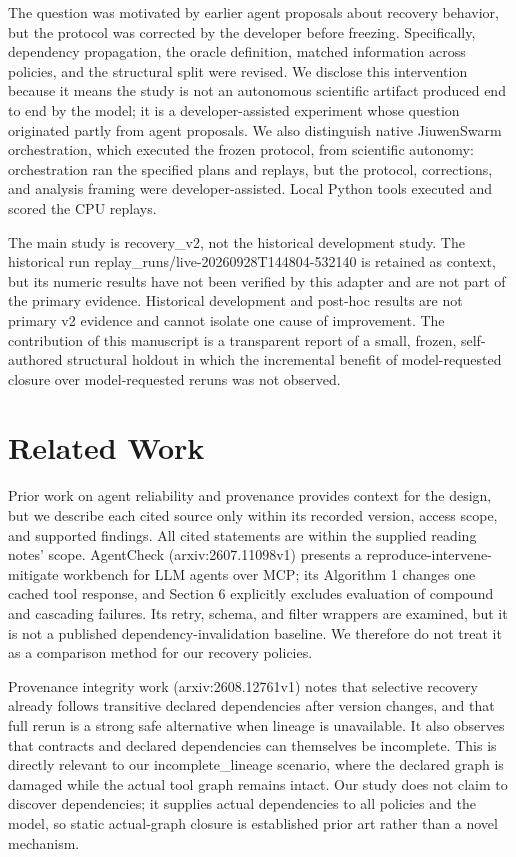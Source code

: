 \documentclass{article}
\begin{document}
The question was motivated by earlier agent proposals about recovery behavior, but the protocol was corrected by the developer before freezing. Specifically, dependency propagation, the oracle definition, matched information across policies, and the structural split were revised. We disclose this intervention because it means the study is not an autonomous scientific artifact produced end to end by the model; it is a developer-assisted experiment whose question originated partly from agent proposals. We also distinguish native JiuwenSwarm orchestration, which executed the frozen protocol, from scientific autonomy: orchestration ran the specified plans and replays, but the protocol, corrections, and analysis framing were developer-assisted. Local Python tools executed and scored the CPU replays.

The main study is recovery\_v2, not the historical development study. The historical run replay\_runs/live-20260928T144804-532140 is retained as context, but its numeric results have not been verified by this adapter and are not part of the primary evidence. Historical development and post-hoc results are not primary v2 evidence and cannot isolate one cause of improvement. The contribution of this manuscript is a transparent report of a small, frozen, self-authored structural holdout in which the incremental benefit of model-requested closure over model-requested reruns was not observed.

\section{Related Work}

Prior work on agent reliability and provenance provides context for the design, but we describe each cited source only within its recorded version, access scope, and supported findings. All cited statements are within the supplied reading notes' scope. AgentCheck (arxiv:2607.11098v1) presents a reproduce-intervene-mitigate workbench for LLM agents over MCP; its Algorithm 1 changes one cached tool response, and Section 6 explicitly excludes evaluation of compound and cascading failures. Its retry, schema, and filter wrappers are examined, but it is not a published dependency-invalidation baseline. We therefore do not treat it as a comparison method for our recovery policies.

Provenance integrity work (arxiv:2608.12761v1) notes that selective recovery already follows transitive declared dependencies after version changes, and that full rerun is a strong safe alternative when lineage is unavailable. It also observes that contracts and declared dependencies can themselves be incomplete. This is directly relevant to our incomplete\_lineage scenario, where the declared graph is damaged while the actual tool graph remains intact. Our study does not claim to discover dependencies; it supplies actual dependencies to all policies and the model, so static actual-graph closure is established prior art rather than a novel mechanism.
\end{document}
